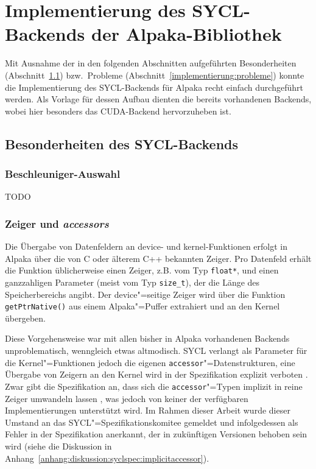 \chapter{Implementierung des SYCL-Backends der Alpaka-Bibliothek}
\label{implementierung}

Mit Ausnahme der in den folgenden Abschnitten aufgeführten Besonderheiten
(Abschnitt~\ref{implementierung:besonderheiten}) bzw.\ Probleme
(Abschnitt~\ref{implementierung:probleme}) konnte die Implementierung des
SYCL-Backends für Alpaka recht einfach durchgeführt werden. Als Vorlage für
dessen Aufbau dienten die bereits vorhandenen Backends, wobei hier besonders
das CUDA-Backend hervorzuheben ist.

\section{Besonderheiten des SYCL-Backends}
\label{implementierung:besonderheiten}

\subsection{Beschleuniger-Auswahl}

TODO

\subsection{Zeiger und \textit{accessors}}
\label{implementierung:besonderheiten:zeiger}

Die Übergabe von Datenfeldern an \gls{device}- und \gls{kernel}-Funktionen
erfolgt in Alpaka über die von C oder älterem C++ bekannten Zeiger. Pro
Datenfeld erhält die Funktion üblicherweise einen Zeiger, z.B. vom Typ
\texttt{float*}, und einen ganzzahligen Parameter (meist vom Typ
\texttt{size\_t}), der die Länge des Speicherbereichs angibt. Der
device"=seitige Zeiger wird über die Funktion \texttt{getPtrNative()} aus einem
Alpaka"=Puffer extrahiert und an den Kernel übergeben.

Diese Vorgehensweise war mit allen bisher in Alpaka vorhandenen Backends
unproblematisch, wenngleich etwas altmodisch. SYCL verlangt als Parameter für
die Kernel"=Funktionen jedoch die eigenen \texttt{accessor}"=Datenstrukturen,
eine Übergabe von Zeigern an den Kernel wird in der Spezifikation explizit
verboten \cite[vgl.][192]{sycl2019}. Zwar gibt die Spezifikation an, dass sich
die \texttt{accessor}"=Typen implizit in reine Zeiger umwandeln lassen
\cite[vgl.][27]{sycl2019}, was jedoch von keiner der verfügbaren
Implementierungen unterstützt wird. Im Rahmen dieser Arbeit wurde dieser Umstand
an das SYCL"=Spezifikationskomitee gemeldet und infolgedessen als Fehler in der
Spezifikation anerkannt, der in zukünftigen Versionen behoben sein wird (siehe
die Diskussion in Anhang~\ref{anhang:diskussion:syclspec:implicitaccessor}).

